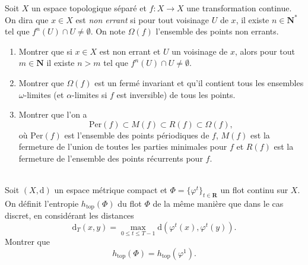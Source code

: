 \documentclass[a4paper,10pt,openany]{article}
\theoremstyle{plain}
\theoremstyle{definition}
\newcommand{\dd}{\mathrm{d}}
\newcommand{\R}{\mathbf{R}}
\newcommand{\N}{\mathbf{N}}
\newcommand{\htop}{h_\mathrm{top}}
\begin{document}
\noindent Soit $X$ un espace topologique s\'epar\'e et $f : X \to X$ une transformation continue. On dira que $x \in X$ est \textit{non errant} si pour tout voisinage $U$ de $x$, il existe $n \in \N^*$ tel que $f^n(U) \cap U \neq \emptyset$. On note $\Omega(f)$ l'ensemble des points non errants.
\begin{enumerate}
\item Montrer que si $x \in X$ est non errant et $U$ un voisinage de $x$, alors pour tout $m \in \N$ il existe $n > m$ tel que $f^{n}(U)\cap U \neq \emptyset$.
\item Montrer que $\Omega(f)$ est un ferm\'e invariant et qu'il contient tous les ensembles $\omega$-limites (et $\alpha$-limites si $f$ est inversible) de tous les points.
\item Montrer que l'on a 
$$
\mathrm{Per}(f) \subset M(f) \subset R(f) \subset \Omega(f),
$$
o\`u $\mathrm{Per}(f)$ est l'ensemble des points p\'eriodiques de $f$, $M(f)$ est la fermeture de l'union de toutes les parties minimales pour $f$ et $R(f)$ est la fermeture de l'ensemble des points r\'ecurrents pour $f$.
\end{enumerate}

\vspace{0.6cm}

 \vspace{1.5mm} \\
\noindent Soit $(X, \dd)$ un espace m\'etrique compact et $\Phi = \{\varphi^t\}_{t \in \R}$ un flot continu sur $X$. On d\'efinit l'entropie $\htop(\Phi)$ du flot $\Phi$ de la m\^eme mani\`ere que dans le cas discret, en consid\'erant les distances
$$
\dd_T(x,y) = \max_{0 \leq t \leq T-1} \dd\left(\varphi^t(x), \varphi^t(y)\right).
$$
Montrer que 
$$
\htop(\Phi) = \htop(\varphi^1).
$$
\vspace{0.6cm}

 \vspace{1.5mm} 
\end{document}
